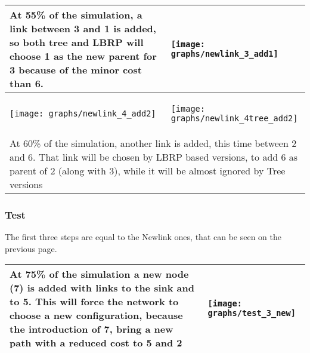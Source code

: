 \documentclass{article}
\begin{document}
	\begin{table}[H]
		\centering
		\begin{tabular}{*{2}{m{}}}
			\hline
			\small At 55\% of the simulation, a link between 3 and 1 is added, so both tree and LBRP will choose 1 as the new parent for 3 because of the minor cost than 6.&\begin{center}\texttt{[image: graphs/newlink\_3\_add1]}\end{center}\\
			\hline
			\begin{center}\texttt{[image: graphs/newlink\_4\_add2]}\end{center}&\begin{center}\texttt{[image: graphs/newlink\_4tree\_add2]}\end{center}\\
			\multicolumn{2}{p{12cm}}{\small At 60\% of the simulation, another link is added, this time between 2 and 6. That link will be chosen by LBRP based versions, to add 6 as parent of 2 (along with 3), while it will be almost ignored by Tree versions}\\
			\hline
		\end{tabular}
		\label{tab:newlinkIndepthP2}
	\end{table}
\subsubsection{Test}
	The first three steps are equal to the Newlink ones, that can be seen on the previous page.
	\begin{table}[H]
		\centering
		\begin{tabular}{*{2}{m{}}}
			\hline
			\small At 75\% of the simulation a new node (7) is added with links to the sink and to 5. This will force the network to choose a new configuration, because the introduction of 7, bring a new path with a reduced cost to 5 and 2&\begin{center}\texttt{[image: graphs/test\_3\_new]}\end{center}\\
			\hline
		\end{tabular}
		\label{tab:testIndepthP1}
	\end{table}
\end{document}
